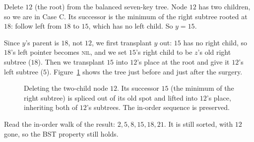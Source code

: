 \begin{example}
\label{ch12:delete-trace}
Delete $12$ (the root) from the balanced seven-key tree. Node $12$ has two children, so we are
in Case C. Its successor is the minimum of the right subtree rooted at $18$: follow left from
$18$ to $15$, which has no left child. So $y = 15$.

Since $y$'s parent is $18$, not $12$, we first transplant $y$ out: $15$ has no right child, so
$18$'s left pointer becomes \textsc{nil}, and we set $15$'s right child to be $z$'s old right
subtree ($18$). Then we transplant $15$ into $12$'s place at the root and give it $12$'s left
subtree ($5$). Figure~\ref{ch12:fig-delete} shows the tree just before and just after the
surgery.
\begin{figure}[H]
\centering
{}
\caption{Deleting the two-child node $12$. Its successor $15$ (the minimum of the right
subtree) is spliced out of its old spot and lifted into $12$'s place, inheriting both of
$12$'s subtrees. The in-order sequence is preserved.}
\label{ch12:fig-delete}
\end{figure}
Read the in-order walk of the result: $2,5,8,15,18,21$. It is still sorted, with $12$ gone, so the
BST property still holds.
\end{example}

